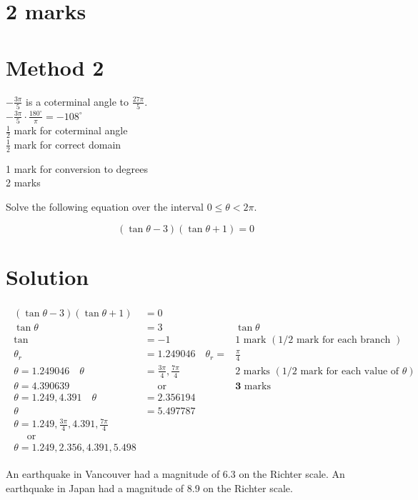 \documentclass[10pt]{article}
\begin{document}
\section*{2 marks}
\section*{Method 2}
$-\frac{3 \pi}{5}$ is a coterminal angle to $\frac{27 \pi}{5}$.\\
$-\frac{3 \pi}{5} \cdot \frac{180^{\circ}}{\pi}=-108^{\circ}$\\
$\frac{1}{2}$ mark for coterminal angle\\
$\frac{1}{2}$ mark for correct domain

1 mark for conversion to degrees\\
2 marks

Solve the following equation over the interval $0 \leq \theta<2 \pi$.

$$
(\tan \theta-3)(\tan \theta+1)=0
$$

\section*{Solution}
$$
\begin{array}{rlr}
\begin{array}{rlr}
(\tan \theta-3)(\tan \theta+1) & =0 & \\
\tan \theta & =3 & \tan \theta \\
\tan & =-1 & 1 \text { mark }(1 / 2 \text { mark for each branch }) \\
\theta_{r} & =1.249046 \quad \theta_{r}= & \frac{\pi}{4} \\
\theta=1.249046 \quad \theta & =\frac{3 \pi}{4}, \frac{7 \pi}{4} & 2 \text { marks }(1 / 2 \text { mark for each value of } \theta) \\
\theta=4.390639 & \quad \text { or } & \mathbf{3} \text { marks } \\
\theta=1.249,4.391 \quad \theta & =2.356194 & \\
\theta & =5.497787 & \\
\theta=1.249, \frac{3 \pi}{4}, 4.391, \frac{7 \pi}{4} & \\
\quad \text { or } & \\
\theta=1.249,2.356,4.391,5.498 &
\end{array}
\end{array}
$$

An earthquake in Vancouver had a magnitude of 6.3 on the Richter scale. An earthquake in Japan had a magnitude of 8.9 on the Richter scale.
\end{document}

